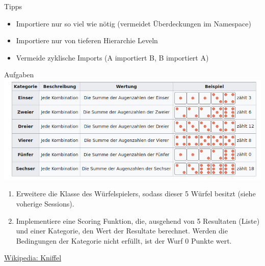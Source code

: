 \begin{frame}[fragile]{Tipps}
    \begin{itemize}
        \item Importiere nur so viel wie nötig (vermeidet Überdeckungen im Namespace)
        \item Importiere nur von tieferen Hierarchie Leveln
        \item Vermeide zyklische Imports (A importiert B, B importiert A)
    \end{itemize}
\end{frame}

\begin{frame}[fragile]{Aufgaben}
    \includegraphics[width=\textwidth]{Kniffel_Tabelle_1.png}

    \begin{enumerate}
        \item Erweitere die Klasse des Würfelspielers, sodass dieser 5 Würfel besitzt (siehe voherige Sessions).
        \item Implementiere eine Scoring Funktion, die, ausgehend von 5 Resultaten (Liste) und einer Kategorie, den Wert der Resultate berechnet. Werden die Bedingungen der Kategorie nicht erfüllt, ist der Wurf 0 Punkte wert.
    \end{enumerate}
    \href{https://de.wikipedia.org/wiki/Kniffel}{Wikipedia: Kniffel}
\end{frame}

